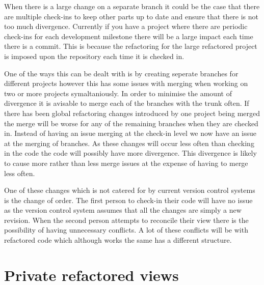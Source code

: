 
When there is a large change on a separate branch it could be the case that there are multiple check-ins to keep other parts up to date and ensure that there is not too much divergence.  Currently if you have a project where there are periodic check-ins for each development milestone there will be a large impact each time there is a commit. This is because the refactoring for the large refactored project is imposed upon the repository each time it is checked in.

One of the ways this can be dealt with is by creating seperate branches for different projects however this has some issues with merging when working on two or more projects symaltaniously.  In order to minimise the amount of divergence it is avisable to merge each of the branches with the trunk often.  If there has been global refactoring changes introduced by one project being merged the merge will be worse for any of the remaining branches when they are checked in.  Instead of having an issue merging at the check-in level we now have an issue at the merging of branches.  As these changes will occur less often than checking in the code the code will possibly have more divergence.  This divergence is likely to cause more rather than less merge issues at the expense of having to merge less often.


One of these changes which is not catered for by current version control systems is the change of order.  The first person to check-in their code will have no issue as the version control system assumes that all the changes are simply a new revision.  When the second person attempts to reconcile their view there is the possibility of having unnecessary conflicts.  A lot of these conflicts will be with refactored code which although works the same has a different structure.

\section{Private refactored views}



